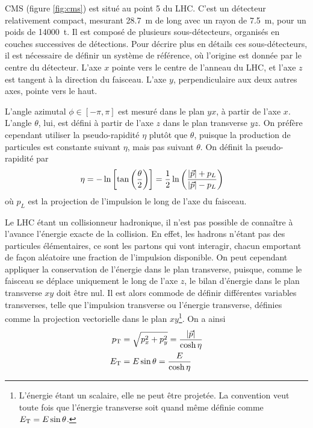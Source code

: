 \bigskip

CMS (figure \ref{fig:cms}) est situé au point 5 du LHC. C'est un détecteur relativement compact, mesurant \SI{28.7}{\m} de long avec un rayon de \SI{7.5}{\m}, pour un poids de \SI{14000}{\tonne}. Il est composé de plusieurs sous-détecteurs, organisés en couches successives de détections. Pour décrire plus en détails ces sous-détecteurs, il est nécessaire de définir un système de référence, où l'origine est donnée par le centre du détecteur. L'axe $x$ pointe vers le centre de l'anneau du LHC, et l'axe $z$ est tangent à la direction du faisceau. L'axe $y$, perpendiculaire aux deux autres axes, pointe vers le haut.

L'angle azimutal $\phi \in \left[-\pi, \pi\right]$ est mesuré dans le plan $yx$, à partir de l'axe $x$. L'angle $\theta$, lui, est défini à partir de l'axe $z$ dans le plan transverse $yz$. On préfère cependant utiliser la pseudo-rapidité $\eta$ plutôt que $\theta$, puisque la production de particules est constante suivant $\eta$, mais pas suivant $\theta$. On définit la pseudo-rapidité par
\begin{align*}
  \eta &= -\ln\left[\tan\left(\frac{\theta}{2}\right)\right] = \frac{1}{2} \ln\left(\frac{\lvert \vec{p} \rvert + p_L}{\lvert \vec{p} \rvert - p_L}\right)
\end{align*}
où $p_L$ est la projection de l'impulsion le long de l'axe du faisceau.

Le LHC étant un collisionneur hadronique, il n'est pas possible de connaître à l'avance l'énergie exacte de la collision. En effet, les hadrons n'étant pas des particules élémentaires, ce sont les partons qui vont interagir, chacun emportant de façon aléatoire une fraction de l'impulsion disponible. On peut cependant appliquer la conservation de l'énergie dans le plan transverse, puisque, comme le faisceau se déplace uniquement le long de l'axe $z$, le bilan d'énergie dans le plan transverse $xy$ doit être nul. Il est alors commode de définir différentes variables transverses, telle que l'impulsion transverse ou l'énergie transverse, définies comme la projection vectorielle dans le plan $xy$\footnote{L'énergie étant un scalaire, elle ne peut être projetée. La convention veut toute fois que l'énergie transverse soit quand même définie comme $E_{\mathrm{T}} = E \sin\theta$.}. On a ainsi
\begin{align*}
  p_{\mathrm{T}} &= \sqrt{p_x^2 + p_y^2} = \frac{\lvert \vec{p} \rvert}{\cosh\eta} \\
  E_{\mathrm{T}} &= E \sin\theta = \frac{E}{\cosh\eta}
\end{align*}

